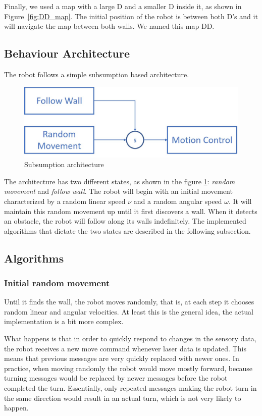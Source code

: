 \documentclass[10pt,journal,compsoc]{IEEEtran}
\begin{document}
Finally, we used a map with a large D and a smaller D inside it, as shown in Figure~\ref{fig:DD_map}. The initial position of the robot is between both D's and it will navigate the map between both walls. We named this map DD.

\subsection{Behaviour Architecture}

The robot follows a simple subsumption based architecture.

\begin{figure}[thpb]
\centering
\includegraphics[scale=0.265]{img/architecture.jpg}
\caption{Subsumption architecture}
\label{fig:architecture}
\end{figure}

The architecture has two different states, as shown in the figure \ref{fig:architecture}: \textit{random movement} and \textit{follow wall}. The robot will begin with an initial movement characterized by a random linear speed $\nu$ and a random angular speed $\omega$. It will maintain this random movement up until it first discovers a wall. When it detects an obstacle, the robot will follow along its walls indefinitely. The implemented algorithms that dictate the two states are described in the following subsection. 

\subsection{Algorithms}
\subsubsection{Initial random movement}\label{subsec:initial}

Until it finds the wall, the robot moves randomly, that is, at each step it chooses random linear and angular velocities. At least this is the general idea, the actual implementation is a bit more complex. 

What happens is that in order to quickly respond to changes in the sensory data, the robot receives a new move command whenever laser data is updated. This means that previous messages are very quickly replaced with newer ones. In practice, when moving randomly the robot would move mostly forward, because turning messages would be replaced by newer messages before the robot completed the turn. Essentially, only repeated messages making the robot turn in the same direction would result in an actual turn, which is not very likely to happen.
\end{document}
